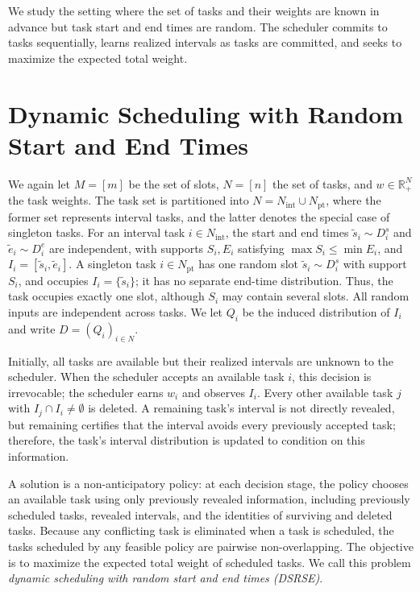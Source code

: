 \documentclass{article}
\newcommand{\R}{\mathbb{R}}
\begin{document}
We study the setting where the set of tasks and their weights are known in advance but task start and end times are random.
The scheduler commits to tasks sequentially, learns realized intervals as tasks are committed, and seeks to maximize the expected total weight.

\section{Dynamic Scheduling with Random Start and End Times}
\label{section:DSRSE}

We again let $M=[m]$ be the set of slots, $N=[n]$ the set of tasks, and $w\in\R_{+}^{N}$ the task weights.
The task set is partitioned into $N=N_{\text{int}}\mathbin{\cup}N_{\text{pt}}$, where the former set represents interval tasks, and the latter denotes the special case of singleton tasks. For an interval task $i\in N_{\mathrm{int}}$, the start and end times $\widetilde s_i\sim D_i^s$ and $\widetilde e_i\sim D_i^e$ are independent, with supports $S_i,E_i$ satisfying $\max S_i\leq\min E_i$, and $I_i=[\widetilde s_i,\widetilde e_i]$. A singleton task $i\in N_{\mathrm{pt}}$ has one random slot $\widetilde s_i\sim D_i^s$ with support $S_i$, and occupies $I_i=\{\widetilde s_i\}$; it has no separate end-time distribution. Thus, the task occupies exactly one slot, although $S_i$ may contain several slots. All random inputs are independent across tasks. We let $Q_i$ be the induced distribution of $I_i$ and write $D=(Q_i)_{i\in N}$. 

Initially, all tasks are available but their realized intervals are unknown to the scheduler. When the scheduler accepts an available task $i$, this decision is irrevocable; the scheduler earns $w_i$ and observes $I_i$.
Every other available task $j$ with $I_j\cap I_i\neq\emptyset$ is deleted. A remaining task's interval is not directly revealed, but remaining certifies that the interval avoids every previously accepted task; therefore, the task's interval distribution is updated to condition on this information. 

{A solution is a non-anticipatory policy: at each decision stage, the policy chooses an available task using only previously revealed information, including previously scheduled tasks, revealed intervals, and the identities of surviving and deleted tasks. Because any conflicting task is eliminated when a task is scheduled, the tasks scheduled by any feasible policy are pairwise non-overlapping.
The objective is to maximize the expected total weight of scheduled tasks}. We call this problem \emph{dynamic scheduling with random start and end times (DSRSE)}.
\end{document}
